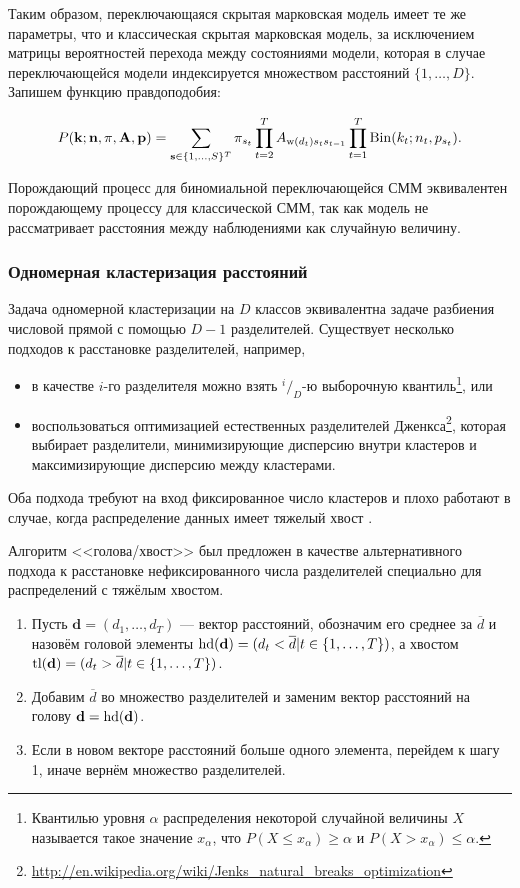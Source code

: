 Таким образом, переключающаяся скрытая марковская модель имеет те же параметры, что
и классическая скрытая марковская модель, за исключением матрицы вероятностей перехода
между состояниями модели, которая в случае переключающейся модели индексируется
множеством расстояний $\{1, \ldots, D\}$. Запишем функцию правдоподобия:

$$
P(\mathbf{k}; \mathbf{n}, \mathbf{\pi}, \mathbf{A}, \mathbf{p})
= \sum\limits_{\mathbf{s} \in \{1, \ldots, S\}^T}
  \pi_{s_t}
  \prod\limits_{t = 2}^T A_{\operatorname{w}(d_t) s_t s_{t - 1}}
  \prod\limits_{t = 1}^T \operatorname{Bin}(k_t; n_t, p_{s_t}).
$$

Порождающий процесс для биномиальной переключающейся СММ эквивалентен порождающему
процессу для классической СММ, так как модель не рассматривает расстояния между
наблюдениями как случайную величину.

\subsubsection{Одномерная кластеризация расстояний}

Задача одномерной кластеризации на $D$ классов эквивалентна задаче
разбиения числовой прямой с помощью $D - 1$ разделителей. Существует
несколько подходов к расстановке разделителей, например,

\begin{itemize}
\item в качестве $i$-го разделителя можно взять $^i/_D$-ю
  выборочную квантиль\footnote{Квантилью уровня $\alpha$ распределения
    некоторой случайной величины $X$ называется такое значение $x_{\alpha}$,
    что $P(X \le x_{\alpha}) \ge \alpha$ и $P(X > x_{\alpha}) \le \alpha$.},
  или
\item воспользоваться оптимизацией естественных разделителей
  Дженкса\footnote{\url{http://en.wikipedia.org/wiki/Jenks_natural_breaks_optimization}},
  которая выбирает разделители, минимизирующие дисперсию внутри кластеров
  и максимизирующие дисперсию между кластерами.
\end{itemize}

Оба подхода требуют на вход фиксированное число кластеров и плохо работают
в случае, когда распределение данных имеет тяжелый хвост \cite{jiang2013head}.

Алгоритм <<голова/хвост>> был предложен в качестве альтернативного подхода к
расстановке нефиксированного числа разделителей специально для распределений
с тяжёлым хвостом.

\begin{enumerate}
\item Пусть $\mathbf{d} = (d_1, \ldots, d_T)$ --- вектор расстояний,
  обозначим его среднее за $\overline{d}$ и назовём головой элементы
  $\operatorname{hd}(\mathbf{d}) = (d_t < \overline{d} | t \in \{1, \ldots, T\})$,
  а хвостом $\operatorname{tl}(\mathbf{d}) = (d_t > \overline{d}| t \in \{1, \ldots, T\})$.
\item Добавим $\overline{d}$ во множество разделителей и заменим вектор расстояний
  на голову $\mathbf{d} = \operatorname{hd}(\mathbf{d})$.
\item Если в новом векторе расстояний больше одного элемента, перейдем к шагу 1,
  иначе вернём множество разделителей.
\end{enumerate}

